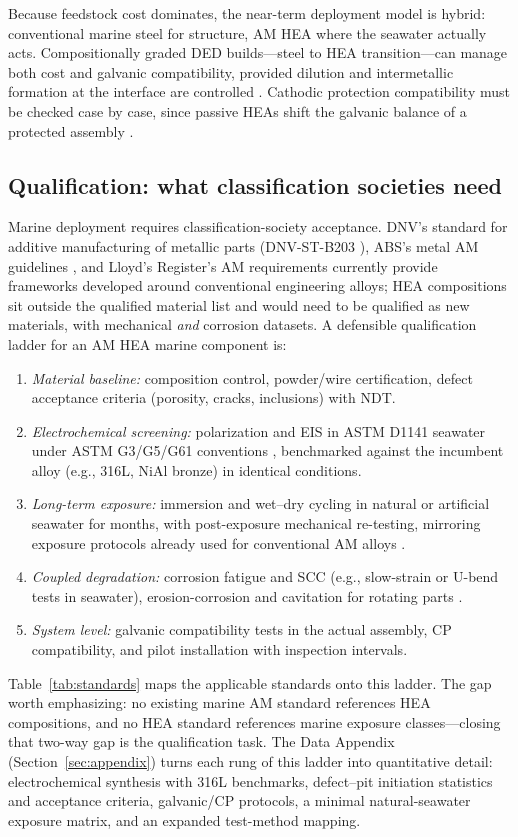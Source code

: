 Because feedstock cost dominates, the near-term deployment model is hybrid: conventional marine steel for structure, AM HEA where the seawater actually acts. Compositionally graded DED builds---steel to HEA transition---can manage both cost and galvanic compatibility, provided dilution and intermetallic formation at the interface are controlled \cite{cagirici2024}. Cathodic protection compatibility must be checked case by case, since passive HEAs shift the galvanic balance of a protected assembly \cite{nass2025marine}.

\subsection{Qualification: what classification societies need}

Marine deployment requires classification-society acceptance. DNV's standard for additive manufacturing of metallic parts (DNV-ST-B203 \cite{dnvstb203}), ABS's metal AM guidelines \cite{abs_mam}, and Lloyd's Register's AM requirements \cite{lr_am} currently provide frameworks developed around conventional engineering alloys; HEA compositions sit outside the qualified material list and would need to be qualified as new materials, with mechanical \emph{and} corrosion datasets. A defensible qualification ladder for an AM HEA marine component is:

\begin{enumerate}
\item \emph{Material baseline:} composition control, powder/wire certification, defect acceptance criteria (porosity, cracks, inclusions) with NDT.
\item \emph{Electrochemical screening:} polarization and EIS in ASTM D1141 seawater \cite{astm_d1141} under ASTM G3/G5/G61 conventions \cite{astm_g3,astm_g5,astm_g61}, benchmarked against the incumbent alloy (e.g., 316L, NiAl bronze) in identical conditions.
\item \emph{Long-term exposure:} immersion and wet--dry cycling in natural or artificial seawater for months, with post-exposure mechanical re-testing, mirroring exposure protocols already used for conventional AM alloys \cite{am_alsi10mg_2026}.
\item \emph{Coupled degradation:} corrosion fatigue and SCC (e.g., slow-strain or U-bend tests in seawater), erosion-corrosion and cavitation for rotating parts \cite{lpbf_316l_scc2022,nass2025marine}.
\item \emph{System level:} galvanic compatibility tests in the actual assembly, CP compatibility, and pilot installation with inspection intervals.
\end{enumerate}

Table~\ref{tab:standards} maps the applicable standards onto this ladder. The gap worth emphasizing: no existing marine AM standard references HEA compositions, and no HEA standard references marine exposure classes---closing that two-way gap is the qualification task. The Data Appendix (Section~\ref{sec:appendix}) turns each rung of this ladder into quantitative detail: electrochemical synthesis with 316L benchmarks, defect--pit initiation statistics and acceptance criteria, galvanic/CP protocols, a minimal natural-seawater exposure matrix, and an expanded test-method mapping.
